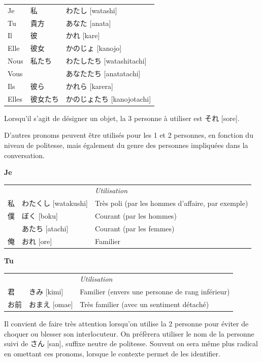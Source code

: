 \documentclass[a4paper,11pt,final]{article}
\newcommand{\sectit}[1]{\bigskip\hspace{-5mm}{\color{sectionblue}$\blacksquare$~~\Large\bfseries #1}}
\newcommand{\romaji}[1]{{\footnotesize[#1]}}
\begin{document}
\hspace{5mm}\begin{tabular}{|p{1.5cm}p{2cm}p{4.5cm}}
    Je       & 私             & わたし \romaji{watashi} \\
    Tu       & 貴方          & あなた \romaji{anata} \\
    Il       & 彼             & かれ \romaji{kare} \\
    Elle     & 彼女          & かのじょ \romaji{kanojo} \\
    Nous     & 私たち       & わたしたち \romaji{watashitachi} \\
    Vous     &                 & あなたたち \romaji{anatatachi} \\
    Ils      & 彼ら          & かれら \romaji{karera} \\
    Elles    & 彼女たち    & かのじょたち \romaji{kanojotachi}
\end{tabular}

Lorsqu'il s'agit de désigner un objet, la 3\ieme{} personne à utiliser est それ
\romaji{sore}.


\sectit{Autres pronoms}

D'autres pronoms peuvent être utilisés pour les 1\iere{} et 2\ieme{} personnes,
en fonction du niveau de politesse, mais également du genre des personnes
impliquées dans la conversation.

\textbf{Je}

\vspace{-7mm}
\hspace{5mm}\begin{tabular}{|p{2cm}p{4.5cm}l}
    \multicolumn{1}{l}{}&& \it\small Utilisation \\
    私    & わたくし \romaji{watakushi}  & Très poli (par les hommes d'affaire,
    par exemple) \\
    僕    & ぼく \romaji{boku}             & Courant (par les hommes) \\
           & あたち \romaji{atachi}        & Courant (par les femmes) \\
    俺    & おれ \romaji{ore}              & Familier
\end{tabular}

\textbf{Tu}

\vspace{-7mm}
\hspace{5mm}\begin{tabular}{|p{2cm}p{4.5cm}l}
    \multicolumn{1}{l}{}&& \it\small Utilisation \\
    君      & きみ \romaji{kimi}      & Familier (envers une personne de rang
    inférieur) \\
    お前   & おまえ \romaji{omae}   & Très familier (avec un sentiment détaché)
\end{tabular}

Il convient de faire très attention lorsqu'on utilise la 2\ieme{} personne pour
éviter de choquer ou blesser son interlocuteur. On préfèrera utiliser le nom de
la personne suivi de さん \romaji{san}, suffixe neutre de politesse. Souvent on
sera même plus radical en omettant ces pronoms, lorsque le contexte permet de
les identifier.
\end{document}
